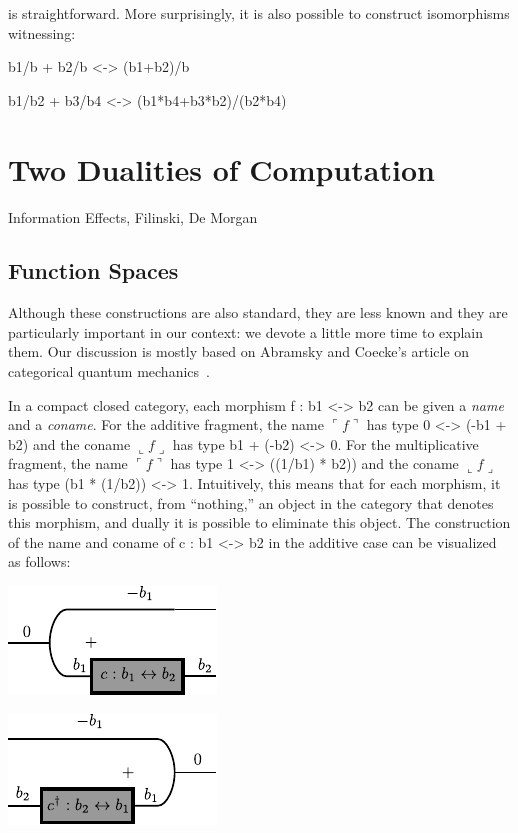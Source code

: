 \documentclass[preprint]{sigplanconf}
\newcommand{\fname}[1]{\ulcorner #1 \urcorner}
\newcommand{\fconame}[1]{\llcorner #1 \lrcorner}
\begin{document}
is straightforward. More surprisingly, it is also possible to construct
isomorphisms witnessing:

{{b1/b + b2/b <-> (b1+b2)/b}}

{{b1/b2 + b3/b4 <-> (b1*b4+b3*b2)/(b2*b4) }}

\section{Two Dualities of Computation}
\label{sub:hof}

Information Effects, Filinski, De Morgan

\subsection{Function Spaces}

Although these constructions are also standard, they are less known and they
are particularly important in our context: we devote a little more time to
explain them. Our discussion is mostly based on Abramsky and Coecke's article
on categorical quantum mechanics~\cite{abramsky-2008}.

In a compact closed category, each morphism {{f : b1 <-> b2 }} can be given a
\emph{name} and a \emph{coname}. For the additive fragment, the name
$\fname{f}$ has type {{0 <-> (-b1 + b2)}} and the coname $\fconame{f}$ has type
{{b1 + (-b2) <-> 0}}. For the multiplicative fragment, the name $\fname{f}$ has
type {{1 <-> ((1/b1) * b2))}} and the coname $\fconame{f}$ has type 
{{(b1 * (1/b2)) <-> 1}}. Intuitively, this means that for each morphism, 
it is possible to construct, from ``nothing,'' an object in the category that 
denotes this morphism, and dually it is possible to eliminate this object.
The construction of the name and coname of {{c : b1 <-> b2}} in the additive case 
can be visualized as follows:

\begin{multicols}{2}
\begin{center}
  \includegraphics{diagrams/function.pdf}
\end{center}

\begin{center}
  \includegraphics{diagrams/delimc.pdf}
\end{center}  
\end{multicols}
\end{document}
